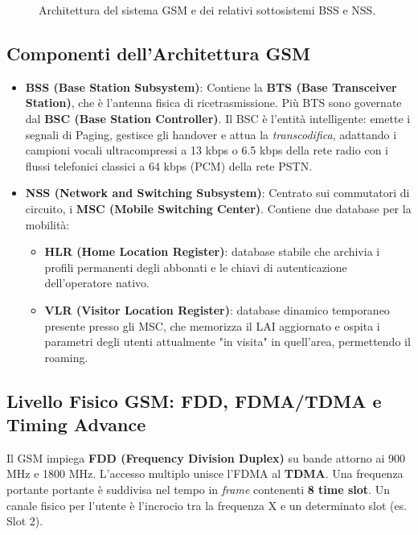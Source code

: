 \begin{figure}[H]
    \centering
    \caption{Architettura del sistema GSM e dei relativi sottosistemi BSS e NSS.}
    \label{fig:gsm-arch}
\end{figure}

\subsection{Componenti dell'Architettura GSM}
\begin{itemize}
    \item \textbf{BSS (Base Station Subsystem)}: Contiene la \textbf{BTS (Base Transceiver Station)}, che è l'antenna fisica di ricetrasmissione. Più BTS sono governate dal \textbf{BSC (Base Station Controller)}. Il BSC è l'entità intelligente: emette i segnali di Paging, gestisce gli handover e attua la \textit{transcodifica}, adattando i campioni vocali ultracompressi a 13 kbps o 6.5 kbps della rete radio con i flussi telefonici classici a 64 kbps (PCM) della rete PSTN.
    \item \textbf{NSS (Network and Switching Subsystem)}: Centrato sui commutatori di circuito, i \textbf{MSC (Mobile Switching Center)}. Contiene due database per la mobilità:
        \begin{itemize}
            \item \textbf{HLR (Home Location Register)}: database stabile che archivia i profili permanenti degli abbonati e le chiavi di autenticazione dell'operatore nativo.
            \item \textbf{VLR (Visitor Location Register)}: database dinamico temporaneo presente presso gli MSC, che memorizza il LAI aggiornato e ospita i parametri degli utenti attualmente "in visita" in quell'area, permettendo il roaming.
        \end{itemize}
\end{itemize}

\subsection{Livello Fisico GSM: FDD, FDMA/TDMA e Timing Advance}
Il GSM impiega \textbf{FDD (Frequency Division Duplex)} su bande attorno ai 900 MHz e 1800 MHz.
L'accesso multiplo unisce l'FDMA al \textbf{TDMA}. Una frequenza portante portante è suddivisa nel tempo in \textit{frame} contenenti \textbf{8 time slot}. Un canale fisico per l'utente è l'incrocio tra la frequenza X e un determinato slot (es. Slot 2).

